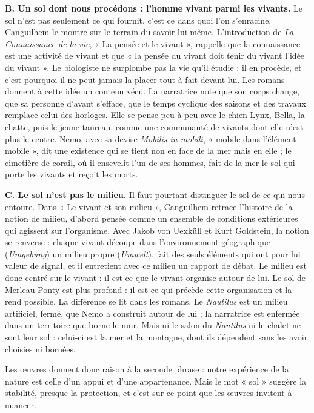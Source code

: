 \documentclass[11pt,a4paper]{article}
\begin{document}
\textbf{B. Un sol dont nous procédons : l'homme vivant parmi les vivants.} Le sol n'est pas seulement ce qui fournit, c'est ce dans quoi l'on s'enracine. Canguilhem le montre sur le terrain du savoir lui-même. L'introduction de \emph{La Connaissance de la vie}, « La pensée et le vivant », rappelle que la connaissance est une activité de vivant et que « la pensée du vivant doit tenir du vivant l'idée du vivant ». Le biologiste ne surplombe pas la vie qu'il étudie : il en procède, et c'est pourquoi il ne peut jamais la placer tout à fait devant lui. Les romans donnent à cette idée un contenu vécu. La narratrice note que son corps change, que sa personne d'avant s'efface, que le temps cyclique des saisons et des travaux remplace celui des horloges. Elle se pense peu à peu avec le chien Lynx, Bella, la chatte, puis le jeune taureau, comme une communauté de vivants dont elle n'est plus le centre. Nemo, avec sa devise \emph{Mobilis in mobili}, « mobile dans l'élément mobile », dit une existence qui se tient non en face de la mer mais en elle ; le cimetière de corail, où il ensevelit l'un de ses hommes, fait de la mer le sol qui porte les vivants et reçoit les morts.

\textbf{C. Le sol n'est pas le milieu.} Il faut pourtant distinguer le sol de ce qui nous entoure. Dans « Le vivant et son milieu », Canguilhem retrace l'histoire de la notion de milieu, d'abord pensée comme un ensemble de conditions extérieures qui agissent sur l'organisme. Avec Jakob von Uexküll et Kurt Goldstein, la notion se renverse : chaque vivant découpe dans l'environnement géographique (\emph{Umgebung}) un milieu propre (\emph{Umwelt}), fait des seuls éléments qui ont pour lui valeur de signal, et il entretient avec ce milieu un rapport de débat. Le milieu est donc centré sur le vivant : il est ce que le vivant organise autour de lui. Le sol de Merleau-Ponty est plus profond : il est ce qui précède cette organisation et la rend possible. La différence se lit dans les romans. Le \emph{Nautilus} est un milieu artificiel, fermé, que Nemo a construit autour de lui ; la narratrice est enfermée dans un territoire que borne le mur. Mais ni le salon du \emph{Nautilus} ni le chalet ne sont leur sol : celui-ci est la mer et la montagne, dont ils dépendent sans les avoir choisies ni bornées.

Les œuvres donnent donc raison à la seconde phrase : notre expérience de la nature est celle d'un appui et d'une appartenance. Mais le mot « sol » suggère la stabilité, presque la protection, et c'est sur ce point que les œuvres invitent à nuancer.
\end{document}
